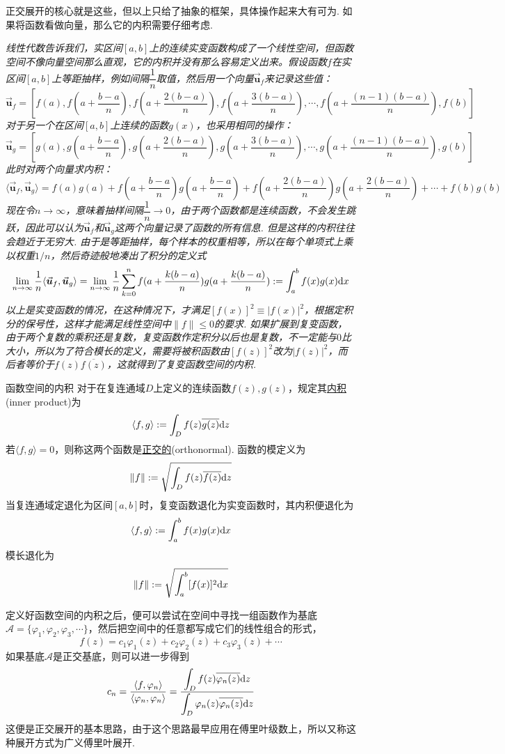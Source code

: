 \documentclass[main.tex]{subfiles}
\begin{document}
正交展开的核心就是这些，但以上只给了抽象的框架，具体操作起来大有可为. 如果将函数看做向量，那么它的内积需要仔细考虑.

\textit{
线性代数告诉我们，实区间\([a,b]\)上的连续实变函数构成了一个线性空间，但函数空间不像向量空间那么直观，它的内积并没有那么容易定义出来。假设函数\(f\)在实区间\([a,b]\)上等距抽样，例如间隔\(\dfrac{1}{n}\)取值，然后用一个向量\(\vec{\bm{u}}_f\)来记录这些值：
\[\vec{\bm{u}}_f = \left[f(a), f(a+\frac{b-a}{n}), f(a+\frac{2(b-a)}{n}), f(a+\frac{3(b-a)}{n}), \cdots, f(a+\frac{(n-1)(b-a)}{n}), f(b)\right]\]
对于另一个在区间\([a,b]\)上连续的函数\(g(x)\)，也采用相同的操作：
\[\vec{\bm{u}}_g = \left[g(a), g(a+\frac{b-a}{n}), g(a+\frac{2(b-a)}{n}), g(a+\frac{3(b-a)}{n}), \cdots, g(a+\frac{(n-1)(b-a)}{n}), g(b)\right]\]
此时对两个向量求内积：
\[\langle\vec{\bm{u}}_f,\vec{\bm{u}}_g\rangle = f(a)g(a)+f(a+\frac{b-a}{n})g(a+\frac{b-a}{n})+f(a+\frac{2(b-a)}{n})g(a+\frac{2(b-a)}{n})+\cdots+f(b)g(b)\]
现在令\(n \to \infty\)，意味着抽样间隔\(\dfrac{1}{n} \to 0\)，由于两个函数都是连续函数，不会发生跳跃，因此可以认为\(\vec{\bm{u}}_f\)和\(\vec{\bm{u}}_g\)这两个向量记录了函数的所有信息. 但是这样的内积往往会趋近于无穷大. 由于是等距抽样，每个样本的权重相等，所以在每个单项式上乘以权重\(1/n\)，然后奇迹般地凑出了积分的定义式
\[\lim_{n \to \infty}\frac{1}{n}\langle\vec{\bm{u}}_f,\vec{\bm{u}}_g\rangle = \lim_{n \to \infty}\frac{1}{n}\sum_{k=0}^{n}f(a+\frac{k(b-a)}{n})g(a+\frac{k(b-a)}{n}) := \int_{a}^{b} f(x)g(x){\rm d}x\]
以上是实变函数的情况，在这种情况下，才满足\([f(x)]^2\equiv|f(x)|^2\)，根据定积分的保号性，这样才能满足线性空间中\(\|f\|\leq 0\)的要求. 如果扩展到复变函数，由于两个复数的乘积还是复数，复变函数作定积分以后也是复数，不一定能与\(0\)比大小，所以为了符合模长的定义，需要将被积函数由\([f(z)]^2\)改为\(|f(z)|^2\)，而后者等价于\(f(z)\overline{f(z)}\)，这就得到了复变函数空间的内积.
}
\begin{definition}{函数空间的内积}
    对于在复连通域\(D\)上定义的连续函数\(f(z),g(z)\)，规定其\uline{内积}(inner product)为
    \[ \langle f,g \rangle := \int_{D} f(z)\overline{g(z)}{\rm d}z\]
    若\(\langle f,g \rangle=0\)，则称这两个函数是\uline{正交的}(orthonormal). 函数的模定义为
    \[ \|f\| := \sqrt{\int_{D}f(z)\overline{f(z)}{\rm d}z}\]
    当复连通域定退化为区间\([a,b]\)时，复变函数退化为实变函数时，其内积便退化为
    \[ \langle f,g \rangle := \int_{a}^{b} f(x)g(x){\rm d}x\]
    模长退化为
    \[ \|f\| := \sqrt{\int_{a}^{b}[f(x)]^2{\rm d}x}\]
\end{definition}

定义好函数空间的内积之后，便可以尝试在空间中寻找一组函数作为基底\(\mathcal{A}=\{\varphi_1,\varphi_2,\varphi_3,\cdots\}\)，然后把空间中的任意都写成它们的线性组合的形式，
\[f(z) = c_1\varphi_1(z)+c_2\varphi_2(z)+c_3\varphi_3(z)+\cdots\]
如果基底\(\mathcal{A}\)是正交基底，则可以进一步得到
\[c_n=\frac{\langle f,\varphi_n \rangle}{\langle \varphi_n,\varphi_n \rangle} = \frac{\displaystyle{\int_{D} f(z)\overline{\varphi_n(z)}{\rm d}z}}{\displaystyle{\int_{D}\varphi_n(z)\overline{\varphi_n(z)}{\rm d}z}}\]
这便是正交展开的基本思路，由于这个思路最早应用在傅里叶级数上，所以又称这种展开方式为广义傅里叶展开.
\end{document}
